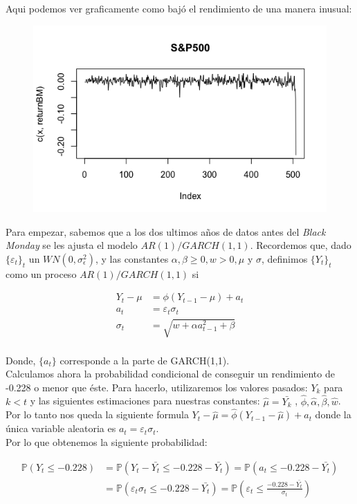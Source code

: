 \documentclass[a4paper,]{article}
\begin{document}
Aqui podemos ver graficamente como bajó el rendimiento de una manera inusual:
\begin{figure}[H]
    \centering %
    \includegraphics[width=0.5\linewidth]{sp.png}
\end{figure}


Para empezar, sabemos que a los dos ultimos años de datos antes del \textit{Black Monday} se les ajusta el modelo $AR(1)/GARCH(1,1)$. Recordemos que, dado $\{\varepsilon_{t}\}_t$ un $WN(0, \sigma_\epsilon^2)$, y las constantes $\alpha,\beta \geq 0,w >0,\mu $ y $\sigma $, definimos $\{Y_{t}\}_t$ como un proceso $AR(1)/GARCH(1,1)$ si

\begin{align*}
    Y_{t} - \mu &= \phi(Y_{t-1} - \mu) + a_{t} \\
    a_{t} &= \varepsilon_{t}\sigma_{t} \\
    \sigma_t&=\sqrt{w +\alpha a_{t-1}^2+\beta} \\
\end{align*}

Donde, $\{a_{t}\}$ corresponde a la parte de GARCH(1,1).\\

Calculamos ahora la probabilidad condicional de conseguir un rendimiento de -0.228 o menor que éste. Para hacerlo, utilizaremos los valores pasados: $Y_{k}$ para $k<t$ y las siguientes estimaciones para nuestras constantes: $\hat{\mu} = \bar{Y_{k}}$ , $ \hat{\phi}, \hat{\alpha}, \hat{\beta}, \hat{w} $. \\

Por lo tanto nos queda la siguiente formula   $Y_{t} - \hat{\mu} = \hat{\phi}(Y_{t-1} - \hat{\mu}) + a_{t} $ donde la única variable aleatoria es 
 $a_{t} = \varepsilon_{t}\sigma_{t}$. \\

Por lo que obtenemos la siguiente probabilidad:

\begin{align*}
    \mathbb{P}(Y_{t} \leq -0.228) &= \mathbb{P}(Y_{t} - \bar{Y_{t}} \leq -0.228 -\bar{Y_{t}}) = \mathbb{P}(a_{t} \leq -0.228 -\bar{Y_{t}})\\ &= \mathbb{P}(\varepsilon_{t}\sigma_{t}\leq -0.228 -\bar{Y_{t}}) = \mathbb{P}(\varepsilon_{t}\leq \frac{-0.228 -\bar{Y_{t}}}{\sigma_{t}})\\
\end{align*}
\end{document}
